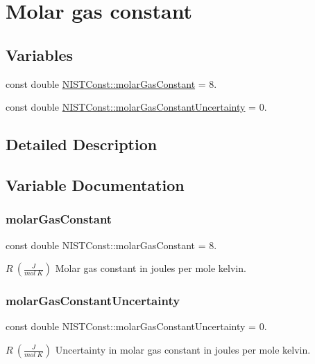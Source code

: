 \hypertarget{group___molar_gas_constant}{}\section{Molar gas constant}
\label{group___molar_gas_constant}
\subsection*{Variables}
\begin{DoxyCompactItemize}
\item 
const double \hyperlink{group___molar_gas_constant_ga923e5cda42e8fec4a70640b82051d309}{N\+I\+S\+T\+Const\+::molar\+Gas\+Constant} = 8.
\item 
const double \hyperlink{group___molar_gas_constant_ga0b24ac606a3ba6a685599a78586fbc77}{N\+I\+S\+T\+Const\+::molar\+Gas\+Constant\+Uncertainty} = 0.
\end{DoxyCompactItemize}


\subsection{Detailed Description}


\subsection{Variable Documentation}
\mbox{\label{group___molar_gas_constant_ga923e5cda42e8fec4a70640b82051d309}} 
\subsubsection{\texorpdfstring{molar\+Gas\+Constant}{molarGasConstant}}
{\footnotesize\ttfamily const double N\+I\+S\+T\+Const\+::molar\+Gas\+Constant = 8.}

$R \ (\frac{J}{mol\ K})$ Molar gas constant in joules per mole kelvin. \mbox{\label{group___molar_gas_constant_ga0b24ac606a3ba6a685599a78586fbc77}} 
\subsubsection{\texorpdfstring{molar\+Gas\+Constant\+Uncertainty}{molarGasConstantUncertainty}}
{\footnotesize\ttfamily const double N\+I\+S\+T\+Const\+::molar\+Gas\+Constant\+Uncertainty = 0.}

$R \ (\frac{J}{mol\ K})$ Uncertainty in molar gas constant in joules per mole kelvin. 